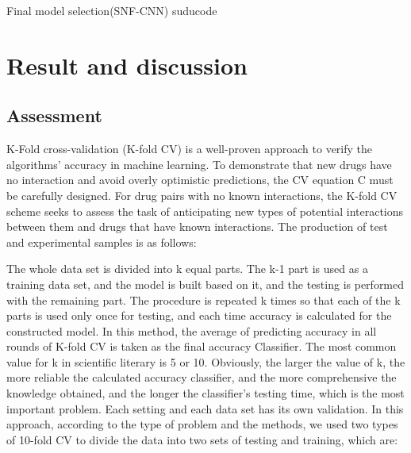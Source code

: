 \documentclass{bmcart}
\begin{document}
\renewcommand{\algorithmicrequire}{\textbf{Input:}}
\renewcommand{\algorithmicensure}{\textbf{Output:}}
\begin{algorithm}[!h]
\caption{Final model selection(SNF-CNN) suducode}
\label{SNFCNNSuducode}
\end{algorithm}


\section*{Result and discussion}
\subsection*{Assessment}
K-Fold cross-validation (K-fold CV) is a well-proven approach to verify the algorithms' accuracy in machine learning. To demonstrate that new drugs have no interaction and avoid overly optimistic predictions, the CV equation C must be carefully designed. For drug pairs with no known interactions, the K-fold CV scheme seeks to assess the task of anticipating new types of potential interactions between them and drugs that have known interactions. The production of test and experimental samples is as follows:

The whole data set is divided into k equal parts. The k-1 part is used as a training data set, and the model is built based on it, and the testing is performed with the remaining part. The procedure is repeated k times so that each of the k parts is used only once for testing, and each time accuracy is calculated for the constructed model. In this method, the average of predicting accuracy in all rounds of K-fold CV is taken as the final accuracy Classifier. The most common value for k in scientific literary is 5 or 10. Obviously, the larger the value of k, the more reliable the calculated accuracy classifier, and the more comprehensive the knowledge obtained, and the longer the classifier's testing time, which is the most important problem. Each setting and each data set has its own validation. In this approach, according to the type of problem and the methods, we used two types of 10-fold CV to divide the data into two sets of testing and training, which are:
\end{document}
